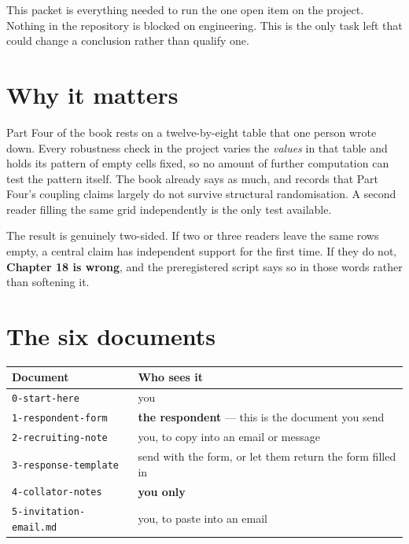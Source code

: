 \documentclass[11pt]{article}
\begin{document}

\begin{note}
This packet is everything needed to run the one open item on the project. Nothing in the
repository is blocked on engineering. This is the only task left that could change a conclusion
rather than qualify one.
\end{note}

\section{Why it matters}

Part Four of the book rests on a twelve-by-eight table that one person wrote down. Every
robustness check in the project varies the \textit{values} in that table and holds its pattern of
empty cells fixed, so no amount of further computation can test the pattern itself. The book
already says as much, and records that Part Four's coupling claims largely do not survive
structural randomisation. A second reader filling the same grid independently is the only test
available.

The result is genuinely two-sided. If two or three readers leave the same rows empty, a central
claim has independent support for the first time. If they do not, \textbf{Chapter 18 is wrong},
and the preregistered script says so in those words rather than softening it.

\section{The six documents}

\begin{center}
\begin{tabular}{@{}ll@{}}
\toprule
\textbf{Document} & \textbf{Who sees it} \\
\midrule
\texttt{0-start-here} & you \\
\texttt{1-respondent-form} & \textbf{the respondent} --- this is the document you send \\
\texttt{2-recruiting-note} & you, to copy into an email or message \\
\texttt{3-response-template} & send with the form, or let them return the form filled in \\
\texttt{4-collator-notes} & \textbf{you only} \\
\texttt{5-invitation-email.md} & you, to paste into an email \\
\bottomrule
\end{tabular}
\end{center}
\end{document}
